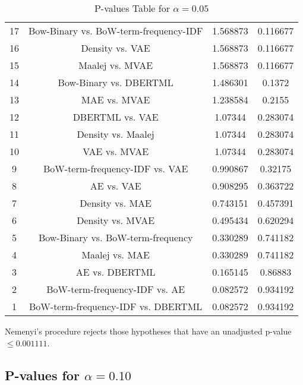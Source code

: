 \documentclass[a4paper,10pt]{article}
\begin{document}
\begin{landscape}
\begin{table}[!htp]
\begin{tabular}{cccc}
17&Bow-Binary vs. BoW-term-frequency-IDF&1.568873&0.116677\\
16&Density vs. VAE&1.568873&0.116677\\
15&Maalej vs. MVAE&1.568873&0.116677\\
14&Bow-Binary vs. DBERTML&1.486301&0.1372\\
13&MAE vs. MVAE&1.238584&0.2155\\
12&DBERTML vs. VAE&1.07344&0.283074\\
11&Density vs. Maalej&1.07344&0.283074\\
10&VAE vs. MVAE&1.07344&0.283074\\
9&BoW-term-frequency-IDF vs. VAE&0.990867&0.32175\\
8&AE vs. VAE&0.908295&0.363722\\
7&Density vs. MAE&0.743151&0.457391\\
6&Density vs. MVAE&0.495434&0.620294\\
5&Bow-Binary vs. BoW-term-frequency&0.330289&0.741182\\
4&Maalej vs. MAE&0.330289&0.741182\\
3&AE vs. DBERTML&0.165145&0.86883\\
2&BoW-term-frequency-IDF vs. AE&0.082572&0.934192\\
1&BoW-term-frequency-IDF vs. DBERTML&0.082572&0.934192\\
\hline
\end{tabular}
\caption{P-values Table for $\alpha=0.05$}
\end{table}Nemenyi's procedure rejects those hypotheses that have an unadjusted p-value $\le0.001111$.

\pagebreak

\subsection{P-values for $\alpha=0.10$}


\end{landscape}
\end{document}
